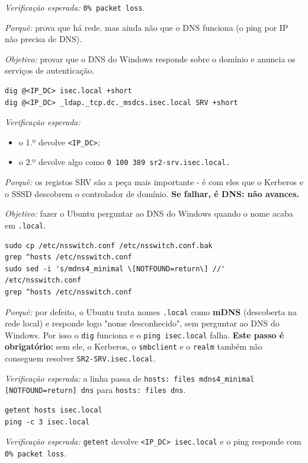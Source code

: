 \emph{Verificação esperada:} \texttt{0\% packet loss}.

\emph{Porquê:} prova que há rede, mas ainda não que o DNS funciona (o ping por IP não precisa de DNS).


\emph{Objetivo:} provar que o DNS do Windows responde sobre o domínio e anuncia os serviços de autenticação.

\begin{lstlisting}[style=bashstyle]
dig @<IP_DC> isec.local +short
dig @<IP_DC> _ldap._tcp.dc._msdcs.isec.local SRV +short
\end{lstlisting}

\emph{Verificação esperada:}

\begin{itemize}
\item o 1.º devolve \texttt{\textless{}IP\_DC\textgreater{}};
\item o 2.º devolve algo como \texttt{0 100 389 sr2-srv.isec.local.}
\end{itemize}

\emph{Porquê:} os registos SRV são a peça mais importante - é com eles que o Kerberos e o SSSD descobrem o controlador de domínio. \textbf{Se falhar, é DNS: não avances.}


\emph{Objetivo:} fazer o Ubuntu perguntar ao DNS do Windows quando o nome acaba em \texttt{.local}.

\begin{lstlisting}[style=bashstyle]
sudo cp /etc/nsswitch.conf /etc/nsswitch.conf.bak
grep ^hosts /etc/nsswitch.conf
sudo sed -i 's/mdns4_minimal \[NOTFOUND=return\] //' /etc/nsswitch.conf
grep ^hosts /etc/nsswitch.conf
\end{lstlisting}

\emph{Porquê:} por defeito, o Ubuntu trata nomes \texttt{.local} como \textbf{mDNS} (descoberta na rede local) e responde logo "nome desconhecido", sem perguntar ao DNS do Windows. Por isso o \texttt{dig} funciona e o \texttt{ping isec.local} falha. \textbf{Este passo é obrigatório:} sem ele, o Kerberos, o \texttt{smbclient} e o \texttt{realm} também não conseguem resolver \texttt{SR2-SRV.isec.local}.

\emph{Verificação esperada:} a linha passa de \texttt{hosts: files mdns4\_minimal [NOTFOUND=return] dns} para \texttt{hosts: files dns}.


\begin{lstlisting}[style=bashstyle]
getent hosts isec.local
ping -c 3 isec.local
\end{lstlisting}

\emph{Verificação esperada:} \texttt{getent} devolve \texttt{\textless{}IP\_DC\textgreater{} isec.local} e o ping responde com \texttt{0\% packet loss}.


